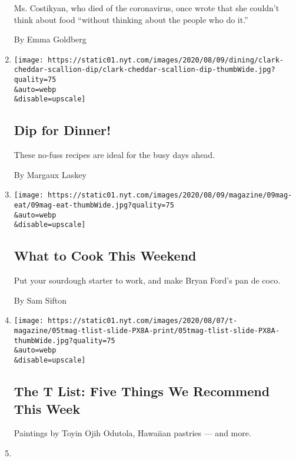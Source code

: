 \begin{enumerate}
  Ms. Costikyan, who died of the coronavirus, once wrote that she
  couldn't think about food ``without thinking about the people who do
  it.''

  By Emma Goldberg
\item
  \href{/2020/08/07/dining/dip-for-dinner.html}{}

  \texttt{[image: https://static01.nyt.com/images/2020/08/09/dining/clark-cheddar-scallion-dip/clark-cheddar-scallion-dip-thumbWide.jpg?quality=75\\\&auto=webp\\\&disable=upscale]}

  \hypertarget{dip-for-dinner}{%
  \subsection{Dip for Dinner!}\label{dip-for-dinner}}

  These no-fuss recipes are ideal for the busy days ahead.

  By Margaux Laskey
\item
  \href{/2020/08/07/dining/what-to-cook-this-weekend.html}{}

  \texttt{[image: https://static01.nyt.com/images/2020/08/09/magazine/09mag-eat/09mag-eat-thumbWide.jpg?quality=75\\\&auto=webp\\\&disable=upscale]}

  \hypertarget{what-to-cook-this-weekend}{%
  \subsection{What to Cook This
  Weekend}\label{what-to-cook-this-weekend}}

  Put your sourdough starter to work, and make Bryan Ford's pan de coco.

  By Sam Sifton
\item
  \href{/2020/08/06/t-magazine/t-list-toyin-ojih-odutola.html}{}

  \texttt{[image: https://static01.nyt.com/images/2020/08/07/t-magazine/05tmag-tlist-slide-PX8A-print/05tmag-tlist-slide-PX8A-thumbWide.jpg?quality=75\\\&auto=webp\\\&disable=upscale]}

  \hypertarget{the-t-list-five-things-we-recommend-this-week}{%
  \subsection{The T List: Five Things We Recommend This
  Week}\label{the-t-list-five-things-we-recommend-this-week}}

  Paintings by Toyin Ojih Odutola, Hawaiian pastries --- and more.
\item
  \href{/2020/08/05/at-home/newsletter.html}{}


\end{enumerate}
